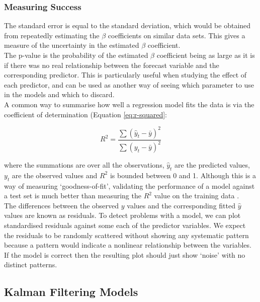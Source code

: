 \subsubsection{Measuring Success}

The standard error is equal to the standard deviation, which would be obtained from repeatedly estimating the $\beta$ coefficients on similar data sets. This gives a measure of the uncertainty in the estimated $\beta$ coefficient. \\

The p-value is the probability of the estimated $\beta$ coefficient being as large as it is if there was no real relationship between the forecast variable and the corresponding predictor. This is particularly useful when studying the effect of each predictor, and can be used as another way of seeing which parameter to use in the models and which to discard. \\ 

A common way to summarise how well a regression model fits the data is via the coefficient of determination (Equation \ref{eq:r-squared}:

\begin{equation}
    R^2 = \frac{\sum(\hat y_t - \bar y)^2}{\sum(y_t - \bar y)^2}
    \label{eq:r-squared}
\end{equation}

where the summations are over all the observations, $\hat y_t$ are the predicted values, $y_t$ are the observed values and $R^2$ is bounded between 0 and 1. Although this is a way of measuring `goodness-of-fit', validating the performance of a model against a test set is much better than measuring the $R^2$ value on the training data \cite{forecasting-book}. \\

The differences between the observed $y$ values and the corresponding fitted $\hat y$ values are known as residuals. To detect problems with a model, we can plot standardised residuals against some each of the predictor variables. We expect the residuals to be randomly scattered without showing any systematic pattern because a pattern would indicate a nonlinear relationship between the variables. If the model is correct then the resulting plot should just show `noise' with no distinct patterns. 

\subsection{Kalman Filtering Models}
\label{section:kalman-models-research}

